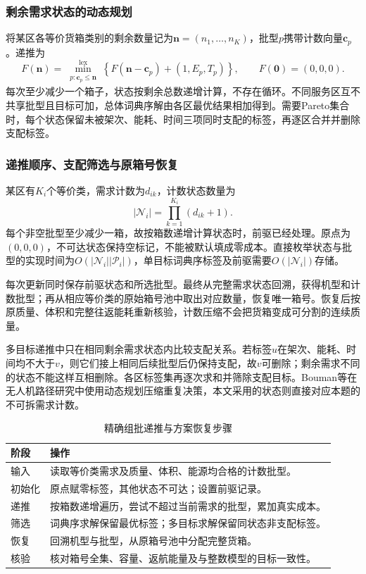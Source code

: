 \documentclass[withoutpreface,colorprint]{format}
\numberwithin{equation}{section}
\numberwithin{figure}{section}
\numberwithin{table}{section}
\begin{document}
\subsubsection{剩余需求状态的动态规划}
将某区各等价货箱类别的剩余数量记为$\boldsymbol n=(n_1,\ldots,n_K)$，批型$p$携带计数向量$\boldsymbol c_p$。递推为
\begin{equation}
 F(\boldsymbol n)=\min_{\substack{p:\boldsymbol c_p\le\boldsymbol n}}^{\mathrm{lex}}
 \left\{F(\boldsymbol n-\boldsymbol c_p)+(1,E_p,T_p)\right\},\qquad F(\boldsymbol0)=(0,0,0).
\label{eq:q1_dp}
\end{equation}
每次至少减少一个箱子，状态按剩余总数递增计算，不存在循环。不同服务区互不共享批型且目标可加，总体词典序解由各区最优结果相加得到。需要Pareto集合时，每个状态保留未被架次、能耗、时间三项同时支配的标签，再逐区合并并删除支配标签。


\subsubsection{递推顺序、支配筛选与原箱号恢复}
某区有$K_i$个等价类，需求计数为$d_{ik}$，计数状态数量为
\begin{equation}
|\mathcal N_i|=\prod_{k=1}^{K_i}(d_{ik}+1).
\label{eq:q1_dp_states}
\end{equation}
每个非空批型至少减少一箱，故按箱数递增计算状态时，前驱已经处理。原点为$(0,0,0)$，不可达状态保持空标记，不能被默认填成零成本。直接枚举状态与批型的实现时间为$O(|\mathcal N_i||\mathcal P_i|)$，单目标词典序标签及前驱需要$O(|\mathcal N_i|)$存储。

每次更新同时保存前驱状态和所选批型。最终从完整需求状态回溯，获得机型和计数批型；再从相应等价类的原始箱号池中取出对应数量，恢复唯一箱号。恢复后按原质量、体积和完整往返能耗重新核验，计数压缩不会把货箱变成可分割的连续质量。

多目标递推中只在相同剩余需求状态内比较支配关系。若标签$u$在架次、能耗、时间均不大于$v$，则它们接上相同后续批型后仍保持支配，故$v$可删除；剩余需求不同的状态不能这样互相删除。各区标签集再逐次求和并筛除支配目标。Bouman等在无人机路径研究中使用动态规划压缩重复决策\cite{bouman2018}，本文采用的状态则直接对应本题的不可拆需求计数。

\begin{table}[htbp]\centering\small
\caption{精确组批递推与方案恢复步骤}\label{tab:dp_execution}
\begin{tabularx}{\linewidth}{p{1.5cm}L}\toprule
阶段 & 操作\\\midrule
输入 & 读取等价类需求及质量、体积、能源均合格的计数批型。\\
初始化 & 原点赋零标签，其他状态不可达；设置前驱记录。\\
递推 & 按箱数递增遍历，尝试不超过当前需求的批型，累加真实成本。\\
筛选 & 词典序求解保留最优标签；多目标求解保留同状态非支配标签。\\
恢复 & 回溯机型与批型，从原箱号池中分配完整货箱。\\
核验 & 核对箱号全集、容量、返航能量及与整数模型的目标一致性。\\\bottomrule
\end{tabularx}
\end{table}
\end{document}
